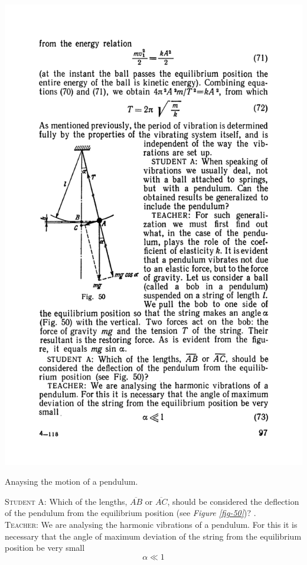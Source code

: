 \documentclass[a4paper,sfsidenotes]{tufte-book}
\begin{document}
\begin{marginfigure}
\centering
\includegraphics[width=\linewidth]{fig-050a.pdf}
\caption{Anaysing the motion of a pendulum.}
\label{fig-50}
\end{marginfigure}
\textsc{Student A:} Which of the lengths, $\overline{AB}$ or $\overline{AC}$, should be considered the deflection of the pendulum from the equilibrium position (see \emph{Figure \ref{fig-50}})? .
\\
\textsc{Teacher:} We are analysing the harmonic vibrations of a pendulum. For this it is necessary that the angle of maximum deviation of the string from the equilibrium position be very small \\
\begin{equation}
\alpha \ll 1
\label{eq-73}
\end{equation}
\end{document}
